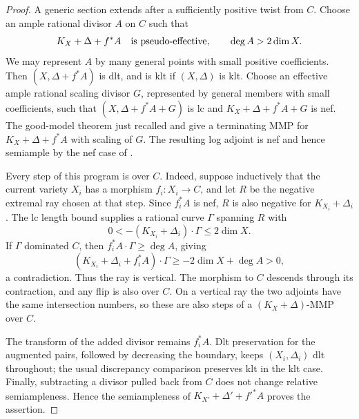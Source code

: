 \begin{proof}
A generic section extends after a sufficiently positive twist from $C$.
Choose an ample rational divisor $A$ on $C$ such that
\[
 K_X+\Delta+f^*A\quad\hbox{is pseudo-effective},
 \qquad \deg A>2\dim X.
\]
We may represent $A$ by many general points with small positive
coefficients.  Then $(X,\Delta+f^*A)$ is dlt, and is klt if
$(X,\Delta)$ is klt.  Choose an effective ample rational scaling
divisor $G$, represented by general members with small coefficients,
such that $(X,\Delta+f^*A+G)$ is lc and
$K_X+\Delta+f^*A+G$ is nef.  The good-model theorem just recalled and
\cite[Theorem~A]{TX} give a terminating MMP for $K_X+\Delta+f^*A$
with scaling of $G$.  The resulting log adjoint is nef and hence
semiample by the nef case of \cite[Theorem~11.1]{LA}.

Every step of this program is over $C$.  Indeed, suppose inductively
that the current variety $X_i$ has a morphism $f_i:X_i\to C$, and let
$R$ be the negative extremal ray chosen at that step.  Since $f_i^*A$
is nef, $R$ is also negative for $K_{X_i}+\Delta_i$.  The lc length
bound \cite[Theorem~1.1(5)]{FujinoMMP} supplies a rational curve
$\Gamma$ spanning $R$ with
\[
 0<-(K_{X_i}+\Delta_i)\cdot\Gamma\le2\dim X.
\]
If $\Gamma$ dominated $C$, then $f_i^*A\cdot\Gamma\ge\deg A$, giving
\[
 (K_{X_i}+\Delta_i+f_i^*A)\cdot\Gamma
 \ge-2\dim X+\deg A>0,
\]
a contradiction.  Thus the ray is vertical.  The morphism to $C$
descends through its contraction, and any flip is also over $C$.
On a vertical ray the two adjoints have the same intersection numbers,
so these are also steps of a $(K_X+\Delta)$-MMP over $C$.

The transform of the added divisor remains $f_i^*A$.  Dlt preservation
for the augmented pairs, followed by decreasing the boundary, keeps
$(X_i,\Delta_i)$ dlt throughout; the usual discrepancy comparison
preserves klt in the klt case.  Finally, subtracting a divisor pulled
back from $C$ does not change relative semiampleness.  Hence the
semiampleness of $K_{X'}+\Delta'+f'^*A$ proves the assertion.
\end{proof}
